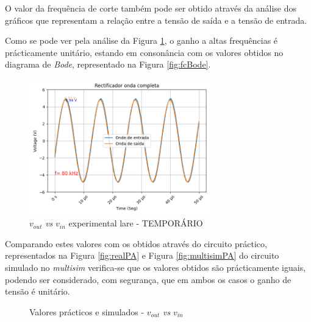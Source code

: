 O valor da frequência de corte também pode ser obtido através da análise dos gráficos que representam a relação entre a tensão de saída e a tensão de entrada. 

Como se pode ver pela análise da Figura \ref{fig:voutvinlare}, o ganho a altas frequências é prácticamente unitário, estando em consonância com os valores obtidos no diagrama de \textit{Bode}, representado na Figura \ref{fig:fcBode}. 

\begin{figure}[hbtp]
	\centering
	\includegraphics[width=0.7\textwidth]{figures/filtro_passa-alto.png}
	\caption{$v_{out}$ \textit{vs} $v_{in}$ experimental \acrshort{lare} - TEMPORÁRIO}
	\label{fig:voutvinlare}
\end{figure}

Comparando estes valores com os obtidos através do circuito práctico, representados na Figura \ref{fig:realPA} e Figura \ref{fig:multisimPA} do circuito simulado no \textit{multisim} verifica-se que os valores obtidos são prácticamente iguais, podendo ser considerado, com segurança, que em ambos os casos o ganho de tensão é unitário. 

\begin{figure}[hbtp]
	\centering%
		\centering
		\qquad
		\caption{Valores prácticos e simulados - $v_{out}$ \textit{vs} $v_{in}$}%
		\label{fig:simulacaoPA}%
	\end{figure}


